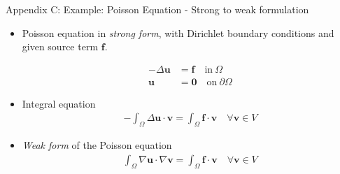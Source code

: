\documentclass[handout,xcolor=pdftex,table,10pt,yellow,mathserif]{beamer}
\begin{document}
\begin{frame}[noframenumbering]{Appendix C: Example: Poisson Equation - Strong to weak formulation}

    \begin{itemize}
        \item Poisson equation in \emph{strong form}, with Dirichlet boundary conditions and
            given source term $\boldsymbol{f}$.

            \begin{align}
                - \Delta \boldsymbol{u} & = \boldsymbol{f} \quad \text{in} \ \Omega \label{eq:poisson_strong}\\
                \boldsymbol{u} &= \boldsymbol{0} \quad \text{on} \ \partial \Omega \nonumber
            \end{align}    

        \pause

        \item Integral equation
            \begin{align*}
                -\int_\Omega \Delta \boldsymbol{u} \cdot \boldsymbol{v} = \int_\Omega \boldsymbol{f} \cdot \boldsymbol{v} \quad \forall \boldsymbol{v} \in V
            \end{align*}

        \pause

        \item \emph{Weak form} of the Poisson equation
            \begin{align}
                \int_\Omega \nabla \boldsymbol{u} \cdot  \nabla \boldsymbol{v} = \int_\Omega \boldsymbol{f} \cdot \boldsymbol{v} \quad \forall \boldsymbol{v} \in V
                \label{eq:poisson_weak}
            \end{align}
    \end{itemize}
\end{frame}
\end{document}

